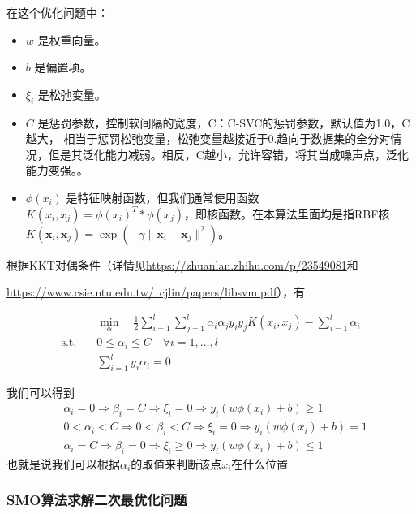 \documentclass[12pt]{ctexart}
\numberwithin{equation}{section} %
\begin{document}
  在这个优化问题中：
  \begin{itemize}
      \item \( w \) 是权重向量。
      \item \( b \) 是偏置项。
      \item \( \xi_i \) 是松弛变量。
      \item \( C \) 是惩罚参数，控制软间隔的宽度，C：C-SVC的惩罚参数，默认值为1.0，C越大， 相当于惩罚松弛变量，松弛变量越接近于0.趋向于数据集的全分对情况，但是其泛化能力减弱。相反，C越小，允许容错，将其当成噪声点，泛化能力变强。。
      \item \( \phi(x_i) \) 是特征映射函数，但我们通常使用函数$ K(x_i, x_j)= \phi(x_i)^T*\phi(x_j)$，即核函数。在本算法里面均是指RBF核$K(\mathbf{x}_{i},\mathbf{x}_{j})=\exp(-\gamma\|\mathbf{x}_{i}-\mathbf{x}_{j}\|^{2})$。
  \end{itemize}
根据KKT对偶条件（详情见\href{https://zhuanlan.zhihu.com/p/23549081}{https://zhuanlan.zhihu.com/p/23549081}和

\href{https://www.csie.ntu.edu.tw/~cjlin/papers/libsvm.pdf}{https://www.csie.ntu.edu.tw/~cjlin/papers/libsvm.pdf}），有

\begin{align*}
  &\min_{\alpha} \quad \frac{1}{2} \sum_{i=1}^{l} \sum_{j=1}^{l} \alpha_i \alpha_j y_i y_j K(x_i, x_j) - \sum_{i=1}^{l} \alpha_i \\
  \text{s.t.} \quad & 0 \leq \alpha_i \leq C \quad \forall i = 1, \ldots, l \\
  & \sum_{i=1}^{l} y_i \alpha_i = 0
\end{align*}

我们可以得到
\begin{equation}
  \begin{split}
      &\alpha_i = 0 \Rightarrow \beta_i = C \Rightarrow \xi_i = 0 \Rightarrow y_i (w \phi(x_i) + b) \geq 1 \\
      &0 < \alpha_i < C \Rightarrow 0 < \beta_i < C \Rightarrow \xi_i = 0 \Rightarrow y_i (w \phi(x_i) + b) = 1 \\
      &\alpha_i = C \Rightarrow \beta_i = 0 \Rightarrow \xi_i \geq 0 \Rightarrow y_i (w \phi(x_i) + b) \leq 1
  \end{split}
  \label{eq:支持向量判断公式}
  \end{equation}
也就是说我们可以根据$\alpha_i$的取值来判断该点$x_i$在什么位置
\subsubsection{SMO算法求解二次最优化问题}
\end{document}
